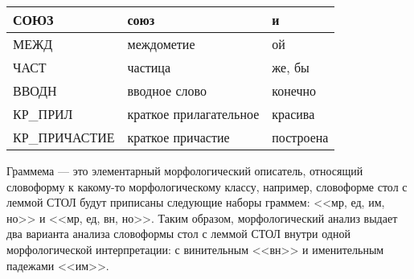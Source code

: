 \documentclass[12pt,a4paper,onecolumn]{report}
\begin{document}
\begin{table}[h!]
\begin{center}
\begin{spacing}{1}
\begin{tabular}{| l | l | l | }
СОЮЗ          & союз                          & и\\ \hline
МЕЖД          & междометие                    & ой\\ \hline
ЧАСТ          & частица                       & же, бы\\ \hline
ВВОДН         & вводное слово                 & конечно\\ \hline
КР\_ПРИЛ      & краткое прилагательное        & красива\\ \hline
КР\_ПРИЧАСТИЕ & краткое причастие             & построена\\ \hline
\end{tabular}
\end{spacing}
\end{center}
\end{table}
\vskip -1cm
Граммема --- это элементарный морфологический описатель, относящий словоформу к какому-то морфологическому классу, например, словоформе стол с леммой СТОЛ будут приписаны следующие наборы граммем: <<мр, ед, им, но>> и <<мр, ед, вн, но>>. Таким образом, морфологический анализ выдает два варианта анализа  словоформы стол с леммой СТОЛ внутри одной морфологической интерпретации: с винительным <<вн>> и именительным падежами <<им>>.
\end{document}
